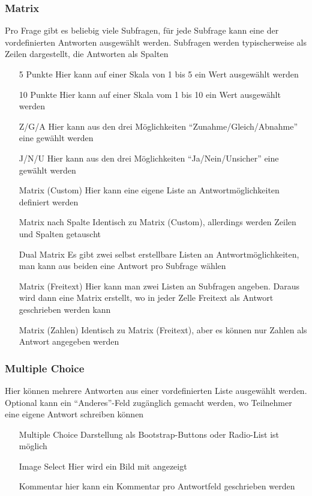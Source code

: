 \subsubsection{Matrix}


Pro Frage gibt es beliebig viele Subfragen, für jede Subfrage kann eine der vordefinierten Antworten ausgewählt werden.
Subfragen werden typischerweise als Zeilen dargestellt, die Antworten als Spalten

\begin{itemize}
	\item[5 Punkte] Hier kann auf einer Skala von 1 bis 5 ein Wert ausgewählt werden
	\item[10 Punkte] Hier kann auf einer Skala vom 1 bis 10 ein Wert ausgewählt werden
	\item[Z/G/A] Hier kann aus den drei Möglichkeiten \enquote{Zunahme/Gleich/Abnahme} eine gewählt werden
	\item[J/N/U] Hier kann aus den drei Möglichkeiten \enquote{Ja/Nein/Unsicher} eine gewählt werden
	\item[Matrix (Custom)] Hier kann eine eigene Liste an Antwortmöglichkeiten definiert werden
	\item[Matrix nach Spalte] Identisch zu Matrix (Custom), allerdings werden Zeilen und Spalten getauscht
	\item[Dual Matrix] Es gibt zwei selbst erstellbare Listen an Antwortmöglichkeiten, man kann aus beiden eine Antwort pro Subfrage wählen
	\item[Matrix (Freitext)] Hier kann man zwei Listen an Subfragen angeben. Daraus wird dann eine Matrix erstellt, wo in jeder Zelle Freitext als Antwort geschrieben werden kann
	\item[Matrix (Zahlen)] Identisch zu Matrix (Freitext), aber es können nur Zahlen als Antwort angegeben werden
\end{itemize}

\subsubsection{Multiple Choice}

Hier können mehrere Antworten aus einer vordefinierten Liste ausgewählt werden.
Optional kann ein \enquote{Anderes}-Feld zugänglich gemacht werden, wo Teilnehmer eine eigene Antwort schreiben können

\begin{itemize}
	\item[Multiple Choice] Darstellung als Bootstrap-Buttons oder Radio-List ist möglich
	\item[Image Select] Hier wird ein Bild mit angezeigt
	\item[Kommentar] hier kann ein Kommentar pro Antwortfeld geschrieben werden
\end{itemize}


